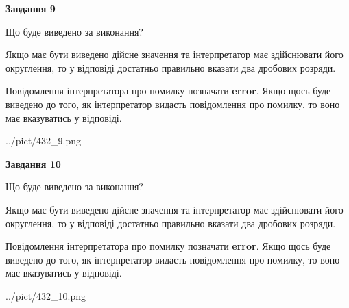 \documentclass[12pt, ukrainian]{article}
\begin{document}
{\begin {Large}
{\begin {center}\textbf{Завдання 9}\end {center}}\par
Що буде виведено за виконання? \par

Якщо має бути виведено дійсне значення та інтерпретатор має здійснювати його округлення, 
то у відповіді достатньо правильно вказати два дробових розряди.

Повідомлення інтерпретатора про помилку позначати \textbf{error}.
Якщо щось буде виведено до того, як інтерпретатор видасть повідомлення про помилку, 
то воно має вказуватись у відповіді. \par

\begin{center}
	{../pict/432_9.png}
\end{center}
\newpage

{\begin {center}\textbf{Завдання 10}\end {center}}\par
Що буде виведено за виконання? \par

Якщо має бути виведено дійсне значення та інтерпретатор має здійснювати його округлення, 
то у відповіді достатньо правильно вказати два дробових розряди.

Повідомлення інтерпретатора про помилку позначати \textbf{error}.
Якщо щось буде виведено до того, як інтерпретатор видасть повідомлення про помилку, 
то воно має вказуватись у відповіді. \par

\begin{center}
	{../pict/432_10.png}
\end{center}
\newpage

\end {Large}}
\end{document}
